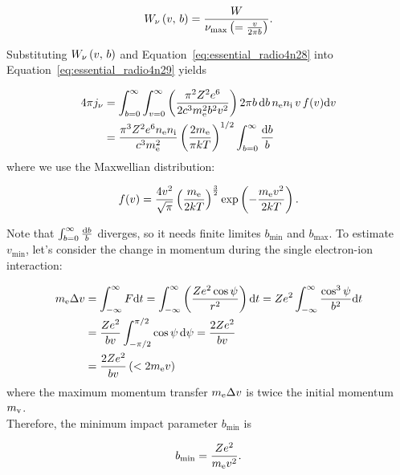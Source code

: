 \begin{equation}\label{eq:maximum_frequency}
    W_{\mathrm{\nu}}\left(v,\,b\right) = \frac{W}{\nu_{\mathrm{\max}} \left(= \frac{v}{2\pi b}\right)}.
\end{equation}

Substituting $W_{\mathrm{\nu}}\left(v,\,b\right)$ and Equation~\ref{eq:essential_radio4n28} into Equation~\ref{eq:essential_radio4n29} yields

\begin{align}
    4 \pi j_{\nu} &= \int_{b=0}^{\infty} \int_{v=0}^{\infty} \left(\frac{\pi^2 Z^2 e^6}{2 c^3 m_{\mathrm{e}}^2 b^2 v^2}\right) 2 \pi b\,\mathrm{d} b\,n_{\mathrm{e}} n_{\mathrm{i}}\,v\,f(v) \mathrm{d} v \label{eq:essential_radio4n30}\\
                  &=\frac{\pi^{3} Z^{2} e^{6} n_{\mathrm{e}} n_{\mathrm{i}}}{c^{3} m_{\mathrm{e}}^{2}} \left(\frac{2m_{\mathrm{e}}}{\pi k T}\right)^{1/2}\int_{b=0}^{\infty} \frac{\mathrm{d} b}{b}\label{eq:essential_radio4n31}
\end{align}
where we use the Maxwellian distribution:

\begin{equation}\label{eq:essential_radio4n34}
    f(v)=\frac{4 v^2}{\sqrt{\pi}} \left(\frac{m_{\mathrm{e}}}{2 k T}\right)^{\frac{3}{2}} \exp \left(-\frac{m_{\mathrm{e}} v^2}{2 k T}\right).
\end{equation}

Note that $\int^{\infty}_{b=0} \frac{\mathrm{d} b}{b}$ diverges, so it needs finite limites $b_{\min}$ and $b_{\max}$.
To estimate $v_{\min}$, let's consider the change in momentum during the single electron-ion interaction:

\begin{align}\label{eq:essential_radio4n40}
    m_{\mathrm{e}} \Delta v &= \int_{-\infty}^{\infty} F \mathrm{d} t = \int_{-\infty}^{\infty}\left(\frac{Z e^{2} \cos \psi}{r^{2}}\right) \mathrm{d} t=Z e^{2} \int_{-\infty}^{\infty} \frac{\cos ^{3} \psi}{b^{2}} \mathrm{d} t \\
                      &= \frac{Z e^{2}}{b v} \int_{-\pi / 2}^{\pi / 2} \cos \psi\,\mathrm{d} \psi=\frac{2 Z e^{2}}{b v} \\
                      &= \frac{2Ze^2}{bv} \left(< 2m_{\mathrm{e}}v\right)
\end{align}
where the maximum momentum transfer $m_{\mathrm{e}} \Delta v$ is twice the initial momentum $m_{\mathrm{v}}$. \\

Therefore, the minimum impact parameter $b_{\min}$ is

\begin{equation}\label{eq:essential_radio4n43}
    b_{\min} = \frac{Ze^2}{m_{\mathrm{e}}v^2}.
\end{equation}

